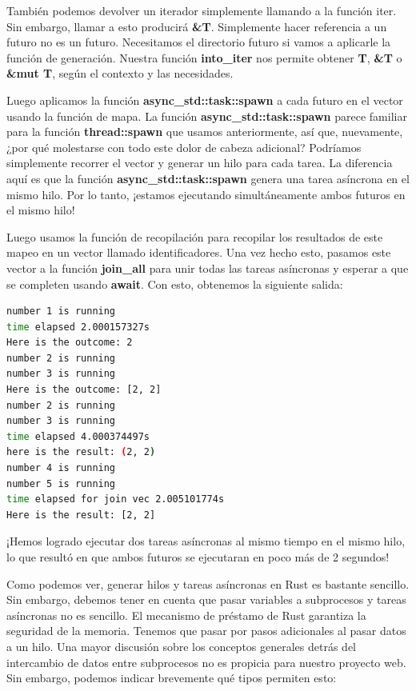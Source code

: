 También podemos devolver un iterador simplemente llamando a la función iter. Sin embargo, llamar a esto producirá \textbf{\&T}. Simplemente hacer referencia a un futuro no es un futuro. Necesitamos el directorio futuro si vamos a aplicarle la función de generación. Nuestra función \textbf{into\_iter} nos permite obtener \textbf{T}, \textbf{\&T} o \textbf{\&mut T}, según el contexto y las necesidades.

Luego aplicamos la función \textbf{async\_std::task::spawn} a cada futuro en el vector usando la función de mapa. La función \textbf{async\_std::task::spawn} parece familiar para la función \textbf{thread::spawn} que usamos anteriormente, así que, nuevamente, ¿por qué molestarse con todo este dolor de cabeza adicional? Podríamos simplemente recorrer el vector y generar un hilo para cada tarea. La diferencia aquí es que la función \textbf{async\_std::task::spawn }genera una tarea asíncrona en el mismo hilo. Por lo tanto, ¡estamos ejecutando simultáneamente ambos futuros en el mismo hilo!

Luego usamos la función de recopilación para recopilar los resultados de este mapeo en un vector llamado identificadores. Una vez hecho esto, pasamos este vector a la función \textbf{join\_all} para unir todas las tareas asíncronas y esperar a que se completen usando \textbf{await}. Con esto, obtenemos la siguiente salida:

\begin{lstlisting}[language=bash]
number 1 is running
time elapsed 2.000157327s
Here is the outcome: 2
number 2 is running
number 3 is running
Here is the outcome: [2, 2]
number 2 is running
number 3 is running
time elapsed 4.000374497s
here is the result: (2, 2)
number 4 is running
number 5 is running
time elapsed for join vec 2.005101774s
Here is the result: [2, 2]
\end{lstlisting}

¡Hemos logrado ejecutar dos tareas asíncronas al mismo tiempo en el mismo hilo, lo que resultó en que ambos futuros se ejecutaran en poco más de 2 segundos!

Como podemos ver, generar hilos y tareas asíncronas en Rust es bastante sencillo. Sin embargo, debemos tener en cuenta que pasar variables a subprocesos y tareas asíncronas no es sencillo. El mecanismo de préstamo de Rust garantiza la seguridad de la memoria. Tenemos que pasar por pasos adicionales al pasar datos a un hilo. Una mayor discusión sobre los conceptos generales detrás del intercambio de datos entre subprocesos no es propicia para nuestro proyecto web. Sin embargo, podemos indicar brevemente qué tipos permiten esto:

